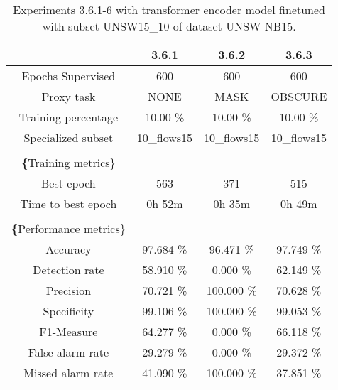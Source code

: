 \begin{table}[htb]
    \centering
    \begin{tabular}{@{}cccc@{}}
        \toprule
         & 3.6.1 & 3.6.2 & 3.6.3 \\
        \midrule
        Epochs Supervised &  600 &  600 &  600 \\
        Proxy task &  NONE &  MASK &  OBSCURE \\
        Training percentage &  10.00 \% &  10.00 \% &  10.00 \% \\
        Specialized subset &  10\_flows15 &  10\_flows15 &  10\_flows15 \\
         \\
        \textbf\{Training metrics\} &  &  &  \\
        Best epoch &  563 &  371 &  515 \\
        Time to best epoch &  0h 52m &  0h 35m &  0h 49m \\
         \\
        \textbf\{Performance metrics\} &  &  &  \\
        Accuracy &  97.684 \% &  96.471 \% &  97.749 \% \\
        Detection rate &  58.910 \% &  0.000 \% &  62.149 \% \\
        Precision &  70.721 \% &  100.000 \% &  70.628 \% \\
        Specificity &  99.106 \% &  100.000 \% &  99.053 \% \\
        F1-Measure &  64.277 \% &  0.000 \% &  66.118 \% \\
        False alarm rate &  29.279 \% &  0.000 \% &  29.372 \% \\
        Missed alarm rate &  41.090 \% &  100.000 \% &  37.851 \% \\
        \bottomrule
    \end{tabular}
    \caption{Experiments 3.6.1-6 with transformer encoder model finetuned with subset UNSW15\_10 of dataset UNSW-NB15.}
    \label{table:results:lstm:stats_flows15_subset}
\end{table}